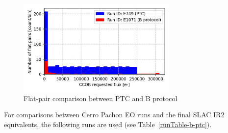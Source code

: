 \begin{figure}[H]
\begin{centering}
\includegraphics[width=0.7\textwidth]{sections/figures/baselineCharacterization/PTC_BProtocol_Comparison.jpg}
	\caption{Flat-pair comparison between PTC and B protocol
\label{fig:PTC_BProtocol_Comparison}}
\end{centering}
\end{figure}

For comparisons between Cerro Pachon EO runs and the final SLAC IR2 equivalents, the following runs are used (see Table~\ref{runTable-b-ptc}).

